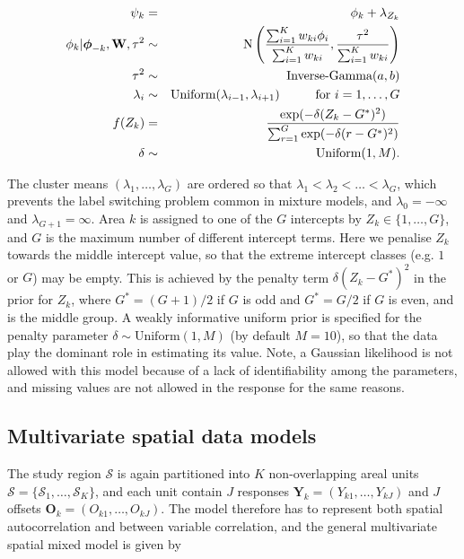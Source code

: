 \documentclass[article,shortnames,nojss]{jss}
\newcommand{\bd}[1]{\ensuremath{\mbox{\boldmath $#1$}}}
\begin{document}
\begin{eqnarray}
\psi_k & = & \phi_{k} + \lambda_{Z_{k}}\label{equation cluster}\\
\phi_{k}| \bd{\phi}_{-k}, \mathbf{W}, \tau^2&\sim&\mbox{N}\left(\frac{\sum_{i=1}^{K}w_{ki}\phi_{i}}{\sum_{i=1}^{K}w_{ki}},\frac{\tau^{2}}{\sum_{i=1}^{K}w_{ki}}\right)\nonumber\\
\tau^{2}&\sim&\mbox{Inverse-Gamma}(a, b)\nonumber\\
\lambda_i & \sim & \mbox{Uniform}(\lambda_{i-1}, \lambda_{i+1})\hspace{1cm}\mbox{for }i=1,\ldots,G\nonumber\\
f(Z_{k})&=&\frac{\exp(-\delta(Z_{k}-G^{*})^{2})}{\sum_{r=1}^{G}\exp(-\delta(r-G^{*})^{2})}\nonumber\\
\delta&\sim&\mbox{Uniform}(1, M).\nonumber
\end{eqnarray}

The cluster means $(\lambda_{1},\ldots,\lambda_{G})$ are ordered so that $\lambda_{1}<\lambda_{2}<\ldots<\lambda_{G}$, which prevents the label switching problem common in mixture models, and $\lambda_{0}=-\infty$ and $\lambda_{G+1}=\infty$.  Area $k$ is assigned to one of the $G$ intercepts by $Z_{k}\in\{1,\ldots,G\}$, and $G$ is the maximum number of different intercept terms. Here we penalise $Z_{k}$ towards the middle intercept value, so that the extreme intercept classes (e.g. $1$ or $G$) may be empty. This is achieved by the penalty term $\delta(Z_{k}-G^{*})^{2}$ in the prior for $Z_{k}$, where $G^{*}=(G+1)/2$ if $G$ is odd and $G^{*}=G/2$ if $G$ is even, and is the middle group. A weakly informative uniform prior is specified for the penalty parameter $\delta\sim\mbox{Uniform}(1,M)$ (by default $M=10$), so that the data play the dominant role in estimating its value. Note, a Gaussian likelihood is not allowed with this model because of a lack of identifiability among the parameters, and missing values are not allowed in the response for the same reasons.


\subsection{Multivariate spatial data models}
The study region $\mathcal{S}$ is again partitioned into $K$ non-overlapping areal units $\mathcal{S}=\{\mathcal{S}_{1},\ldots,\mathcal{S}_{K}\}$, and each unit contain $J$ responses  $\mathbf{Y}_{k}=(Y_{k1},\ldots,Y_{kJ})$ and $J$ offsets $\mathbf{O}_{k}=(O_{k1},\ldots,O_{kJ})$. The model therefore has to represent both spatial autocorrelation and between variable correlation, and the general multivariate spatial mixed model  is given by
\end{document}
